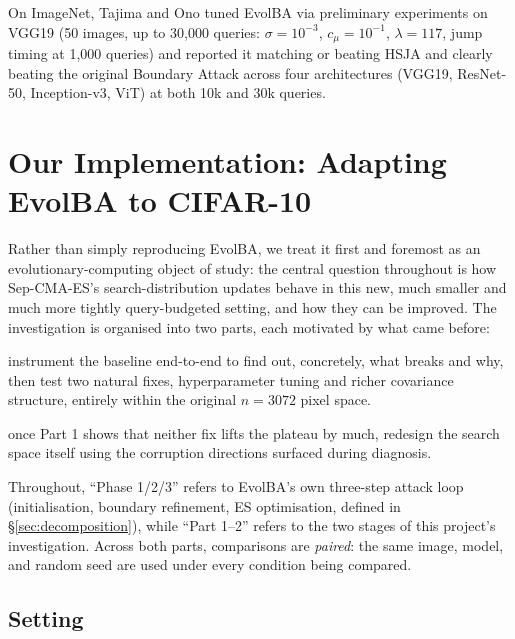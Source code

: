\documentclass[11pt, a4paper]{article}
\begin{document}
On ImageNet, Tajima and Ono tuned EvolBA via preliminary experiments on VGG19 (50 images, up to 30,000 queries: $\sigma=10^{-3}$, $c_\mu=10^{-1}$, $\lambda=117$, jump timing at 1,000 queries) and reported it matching or beating HSJA and clearly beating the original Boundary Attack across four architectures (VGG19, ResNet-50, Inception-v3, ViT) at both 10k and 30k queries.

\section{Our Implementation: Adapting EvolBA to CIFAR-10}
\label{sec:our_impl}

Rather than simply reproducing EvolBA, we treat it first and foremost as an evolutionary-computing object of study: the central question throughout is how Sep-CMA-ES's search-distribution updates behave in this new, much smaller and much more tightly query-budgeted setting, and how they can be improved. The investigation is organised into two parts, each motivated by what came before:

\begin{description}[noitemsep]
  \item[Part 1 (Diagnosis and the limits of pixel-space fixes, \S\ref{sec:diagnosis}):] instrument the baseline end-to-end to find out, concretely, what breaks and why, then test two natural fixes, hyperparameter tuning and richer covariance structure, entirely within the original $n=3072$ pixel space.
  \item[Part 2 (Inductive bias in the search space, \S\ref{sec:inductive_bias}):] once Part 1 shows that neither fix lifts the plateau by much, redesign the search space itself using the corruption directions surfaced during diagnosis.
\end{description}

Throughout, ``Phase 1/2/3'' refers to EvolBA's own three-step attack loop (initialisation, boundary refinement, ES optimisation, defined in \S\ref{sec:decomposition}), while ``Part 1--2'' refers to the two stages of this project's investigation. Across both parts, comparisons are \emph{paired}: the same image, model, and random seed are used under every condition being compared.

\subsection{Setting}
\end{document}

